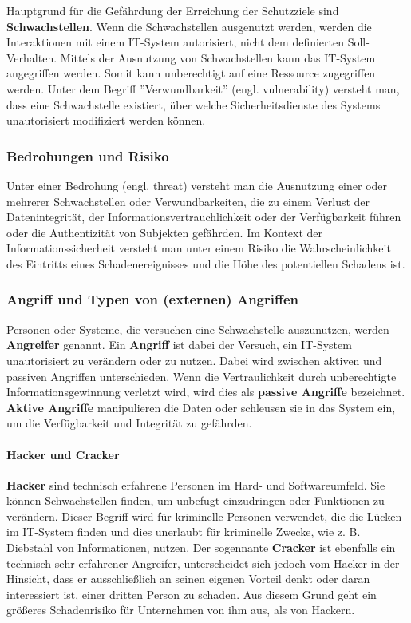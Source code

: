 Hauptgrund für die Gefährdung der Erreichung der Schutzziele sind \textbf{Schwachstellen}. Wenn die Schwachstellen ausgenutzt werden, werden die Interaktionen mit einem IT-System autorisiert, nicht dem definierten Soll-Verhalten. Mittels der Ausnutzung von Schwachstellen kann das IT-System angegriffen werden. Somit kann unberechtigt auf eine Ressource zugegriffen werden\cite[19--20]{nowey2011einleitung}. Unter dem Begriff ''Verwundbarkeit'' (engl. vulnerability) versteht man, dass eine Schwachstelle existiert, über welche Sicherheitsdienste des Systems unautorisiert modifiziert werden können\cite[38]{eckert2013sicherheit}.

\subsubsection{Bedrohungen und Risiko}

Unter einer Bedrohung (engl. threat) versteht man die Ausnutzung einer oder mehrerer Schwachstellen oder Verwundbarkeiten, die zu einem Verlust der Datenintegrität, der Informationsvertrauchlichkeit oder der Verfügbarkeit führen oder die Authentizität von Subjekten gefährden\cite[39]{eckert2013sicherheit}. Im Kontext der Informationssicherheit versteht man unter einem Risiko die Wahrscheinlichkeit des Eintritts eines Schadenereignisses und die Höhe des potentiellen Schadens ist\cite[15]{nowey2011einleitung}.

\subsubsection{Angriff und Typen von (externen) Angriffen}

Personen oder Systeme, die versuchen eine Schwachstelle auszunutzen, werden \textbf{Angreifer} genannt. Ein \textbf{Angriff} ist dabei der Versuch, ein IT-System unautorisiert zu verändern oder zu nutzen. Dabei wird zwischen aktiven und passiven Angriffen unterschieden. Wenn die Vertraulichkeit durch unberechtigte Informationsgewinnung verletzt wird, wird dies als \textbf{passive Angriffe} bezeichnet. \textbf{Aktive Angriffe} manipulieren die Daten oder schleusen sie in das System ein, um die Verfügbarkeit und Integrität zu gefährden\cite[20]{nowey2011einleitung}.

\paragraph{Hacker und Cracker}\mbox{}

\textbf{Hacker} sind technisch erfahrene Personen im Hard- und Softwareumfeld. Sie können Schwachstellen finden, um unbefugt einzudringen oder Funktionen zu verändern\cite{hack17}. Dieser Begriff wird für kriminelle Personen verwendet, die die Lücken im IT-System finden und dies unerlaubt für kriminelle Zwecke, wie z. B. Diebstahl von Informationen, nutzen\cite{hack11}. 
Der sogennante \textbf{Cracker} ist ebenfalls ein technisch sehr erfahrener Angreifer, unterscheidet sich jedoch vom Hacker in der Hinsicht, dass er ausschließlich an seinen eigenen Vorteil denkt oder daran interessiert ist, einer dritten Person zu schaden. Aus diesem Grund geht ein größeres Schadenrisiko für Unternehmen von ihm aus, als von Hackern\cite[45]{eckert2013sicherheit}.

